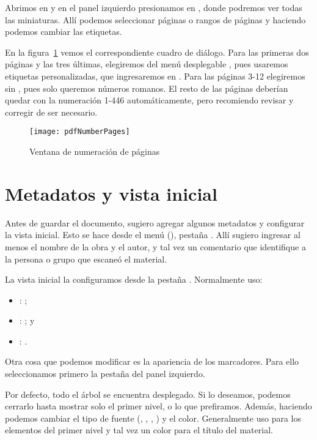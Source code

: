 \documentclass[%
	a5paper,
	10pt,
	twoside,
	openright,
	final,
]{memoir}
\begin{document}
	Abrimos  en \acrobat y en el panel izquierdo presionamos en , donde podremos ver todas las miniaturas. Allí podemos seleccionar páginas o rangos de páginas y haciendo  podemos cambiar las etiquetas.

	En la figura~\ref{fig:pdfNumberPages} vemos el correspondiente cuadro de diálogo. Para las primeras dos páginas y las tres últimas, elegiremos  del menú desplegable , pues usaremos etiquetas personalizadas, que ingresaremos en . Para las páginas 3-12 elegiremos  sin , pues solo queremos números romanos. El resto de las páginas deberían quedar con la numeración 1-446 automáticamente, pero recomiendo revisar y corregir de ser necesario.

	\begin{figure}
		\texttt{[image: pdfNumberPages]}
		\caption{Ventana de numeración de páginas\label{fig:pdfNumberPages}}
	\end{figure}

	\section{Metadatos y vista inicial} Antes de guardar el documento, sugiero agregar algunos metadatos y configurar la vista inicial. Esto se hace desde el menú  (), pestaña . Allí sugiero ingresar al menos el nombre de la obra y el autor, y tal vez un comentario que identifique a la persona o grupo que escaneó el material.

	La vista inicial la configuramos desde la pestaña . Normalmente uso:
	\begin{itemize}[noitemsep]
		\item {}: ;
		\item {}: ; y
		\item {}: .
	\end{itemize}

	Otra cosa que podemos modificar es la apariencia de los marcadores. Para ello seleccionamos primero la pestaña  del panel izquierdo.

	Por defecto, todo el árbol se encuentra desplegado. Si lo deseamos, podemos cerrarlo hasta mostrar solo el primer nivel, o lo que prefiramos. Además, haciendo  podemos cambiar el tipo de fuente (, , , ) y el color. Generalmente uso  para los elementos del primer nivel y tal vez un color para el título del material.
\end{document}
